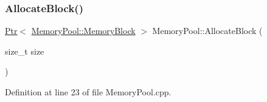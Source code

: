 \subsubsection{\texorpdfstring{AllocateBlock()}{AllocateBlock()}}
{\footnotesize\ttfamily \mbox{\hyperlink{classpdl_1_1memory_1_1_ptr}{Ptr}}$<$ \mbox{\hyperlink{classpdl_1_1memory_1_1_memory_pool_ae6b2ec19cb71cae4fa60b7d342a1743b}{Memory\+Pool\+::\+Memory\+Block}} $>$ Memory\+Pool\+::\+Allocate\+Block (\begin{DoxyParamCaption}\item[{size\+\_\+t}]{size }\end{DoxyParamCaption})\hspace{0.3cm}{\ttfamily [private]}}



Definition at line 23 of file Memory\+Pool.\+cpp.



